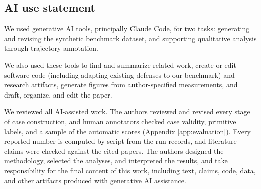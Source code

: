 \subsection*{AI use statement}

We used generative AI tools, principally Claude Code, for two tasks: generating and revising the synthetic benchmark dataset, and supporting qualitative analysis through trajectory annotation.

We also used these tools to find and summarize related work, create or edit
software code (including adapting existing defenses to our benchmark) and research artifacts, generate figures from author-specified
measurements, and draft, organize, and edit the paper.

We reviewed all AI-assisted work. The authors reviewed and revised every stage of case construction, and human annotators checked case validity, primitive labels, and a sample of the automatic scores (Appendix \ref{app:evaluation}). Every reported number is computed by script from the run records, and literature claims were checked against the cited papers. The authors designed the methodology, selected the analyses, and interpreted the results, and take responsibility for the final content of this work, including text, claims, code, data, and other artifacts produced with generative AI assistance.


